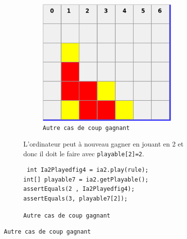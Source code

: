 \begin{figure}[H]
\begin{figure}[H]
\begin{figure}[H]
\begin{center}
  \includegraphics[scale=0.2]{playable3}
  \caption{\texttt{Autre cas de coup gagnant}}
\end{center}
\end{figure}

L'ordinateur peut à nouveau gagner en jouant en 2 et
donc il doit le faire avec \texttt{playable[2]=2}.

\begin{verbatim}
 int Ia2Playedfig4 = ia2.play(rule);
int[] playable7 = ia2.getPlayable();
assertEquals(2 , Ia2Playedfig4);
assertEquals(3, playable7[2]);
\end{verbatim}



\end{figure}
\end{figure}
